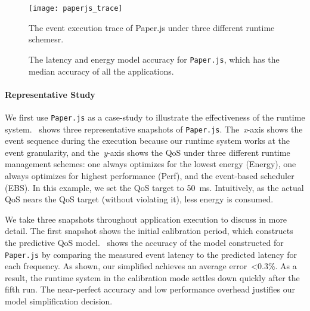 \begin{figure}[t]
\centering
\texttt{[image: paperjs\_trace]}
\caption{The event execution trace of Paper.js under three different runtime schemesr.}
\label{fig:paperjs_trace}
\end{figure}

\begin{figure}[t]
        \caption{\small The latency and energy model accuracy for \texttt{Paper.js}, which has the median accuracy of all the applications.}
        \label{fig:model_pred}
\end{figure}

\paragraph{Representative Study} We first use \texttt{Paper.js} as a case-study to illustrate the effectiveness of the runtime system.~ shows three representative snapshots of \texttt{Paper.js}. The~\textit{x}-axis shows the event sequence during the execution because our runtime system works at the event granularity, and the~\textit{y}-axis shows the QoS under three different runtime management schemes: one always optimizes for the lowest energy (Energy), one always optimizes for highest performance (Perf), and the event-based scheduler (EBS). In this example, we set the QoS target to 50~ms. Intuitively, as the actual QoS nears the QoS target (without violating it), less energy is consumed.

We take three snapshots throughout application execution to discuss in more detail. The first snapshot shows the initial calibration period, which constructs the predictive QoS model.~ shows the accuracy of the model constructed for \texttt{Paper.js} by comparing the measured event latency to the predicted latency for each frequency. As shown, our simplified achieves an average error~\textless 0.3\%. As a result, the runtime system in the calibration mode settles down quickly after the fifth run. The near-perfect accuracy and low performance overhead justifies our model simplification decision.

